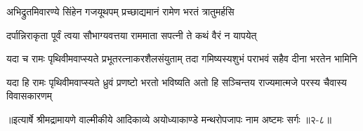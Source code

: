 \twolineshloka
{अभिद्रुतमिवारण्ये सिंहेन गजयूथपम्}
{प्रच्छाद्यमानं रामेण भरतं त्रातुमर्हसि} %

\twolineshloka
{दर्पान्निराकृता पूर्वं त्वया सौभाग्यवत्तया}
{राममाता सपत्नी ते कथं वैरं न यापयेत्} %

\twolineshloka
{यदा च रामः पृथिवीमवाप्स्यते प्रभूतरत्नाकरशैलसंयुताम्}
{तदा गमिष्यस्यशुभं पराभवं सहैव दीना भरतेन भामिनि} %

\twolineshloka
{यदा हि रामः पृथिवीमवाप्स्यते ध्रुवं प्रणष्टो भरतो भविष्यति}
{अतो हि सञ्चिन्तय राज्यमात्मजे परस्य चैवास्य विवासकारणम्} %


॥इत्यार्षे श्रीमद्रामायणे वाल्मीकीये आदिकाव्ये अयोध्याकाण्डे मन्थरोपजापः नाम अष्टमः सर्गः ॥२-८॥
